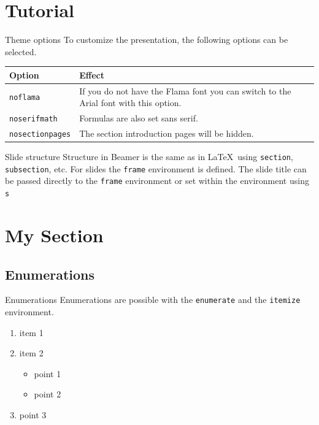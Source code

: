 \documentclass[xcolor={svgnames},12pt,aspectratio=169,handout]{beamer}
\begin{document}
\section{Tutorial}

\begin{frame}[shrink]{Theme options}
    To customize the presentation, the following options can be selected.

    \begin{table}[]
        \begin{tabularx}{\linewidth}{l>{\raggedright}X}
            \toprule
            \textbf{Option} & \textbf{Effect} \tabularnewline
            \midrule
            \texttt{noflama} & If you do not have the Flama font you can switch to the Arial font with this option. \tabularnewline
            \texttt{noserifmath} & Formulas are also set sans serif. \tabularnewline
            \texttt{nosectionpages} & The section introduction pages will be hidden.\tabularnewline
            \bottomrule
        \end{tabularx}
        \label{tab:options}
    \end{table}
\end{frame}

\begin{frame}[fragile]{Slide structure}
    Structure in Beamer is the same as in \LaTeX\ using \lstinline!section!, \lstinline!subsection!, etc. For slides the \lstinline!frame! environment is defined.
    The slide title can be passed directly to the \lstinline!frame! environment or set within the environment using \lstinline!s!
\end{frame}

\section{My Section}

\subsection{Enumerations}

\begin{frame}[fragile]{Enumerations}
    Enumerations are possible with the \lstinline!enumerate! and the \lstinline!itemize! environment.

    \begin{enumerate}
        \item item 1
        \item item 2
        \begin{itemize}
            \item point 1
            \item point 2
        \end{itemize}
        \item point 3
    \end{enumerate}
\end{frame}
\end{document}
